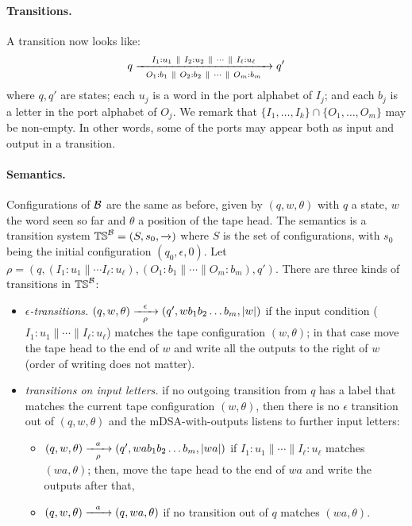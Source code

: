 \paragraph*{Transitions.} A transition now looks like:
\begin{align*}
q \xrightarrow[~~O_1: b_1 ~\parallel~ O_2: b_2 ~\parallel~ \cdots ~\parallel~ O_m: b_m~~]{I_1: u_1 ~\parallel~ I_2: u_2 ~\parallel~ \cdots ~\parallel~ I_\ell: u_\ell} q'
\end{align*}
where $q, q'$ are states; each $u_j$ is a word in the port alphabet of $I_j$; and each $b_j$ is a letter in the port alphabet of $O_j$. We remark that $\{I_1, \dots, I_k\} \cap \{O_1, \dots, O_m\}$ may be non-empty. In other words, some of the ports may appear both as input and output in a transition.  

\paragraph*{Semantics.} Configurations of $\mathcal{B}$ are the same as before, given by $(q, w, \theta)$ with $q$ a state, $w$ the word seen so far and $\theta$ a position of the tape head. The semantics is a transition system $\mathbb{TS}^{\mathcal{B}} = (S, s_0, \xrightarrow{})$ where $S$ is the set of configurations, with $s_0$ being the initial configuration $(q_0, \epsilon, 0)$. Let $\rho = (q, (I_1: u_1 \parallel \cdots I_\ell:u_\ell), (O_1: b_1 \parallel \cdots \parallel O_m: b_m), q')$. There are three kinds of transitions in $\mathbb{TS}^{\mathcal{B}}$:
\begin{itemize}
\item \emph{$\epsilon$-transitions.} $(q, w, \theta) \xrightarrow[\rho]{~~\epsilon~~} (q', wb_1 b_2 \dots b_m, |w|)$ if the input condition ($I_1:u_1 \parallel \cdots \parallel I_\ell:u_\ell$) matches the tape configuration $(w, \theta)$; in that case move the tape head to the end of $w$ and write all the outputs to the right of $w$ (order of writing does not matter).
\item \emph{transitions on input letters.} if no outgoing transition from $q$ has a label that  matches the current tape configuration $(w, \theta)$, then there is no $\epsilon$ transition out of $(q, w, \theta)$ and the mDSA-with-outputs listens to further input letters: 
\begin{itemize}
\item $(q, w, \theta) \xrightarrow[\rho]{~~a~~} (q', wab_1 b_2 \dots b_m, |wa|)$ if $I_1:u_1 \parallel \cdots \parallel I_\ell:u_\ell$ matches $(wa, \theta)$; then, move the tape head to the end of $wa$ and write the outputs after that,
\item $(q, w, \theta) \xrightarrow{~~a~~} (q, wa, \theta)$ if no transition out of $q$ matches $(wa, \theta)$.
\end{itemize}
\end{itemize} 
